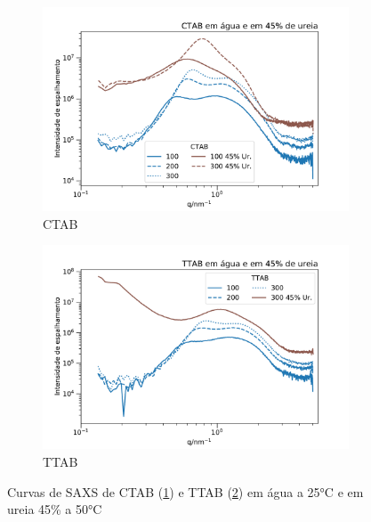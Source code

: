 	\begin{figure}[H]
		\begin{subfigure}[t]{0.45\textwidth}
			\centering
			\includegraphics[width=\textwidth]{./imagens/saxs/micelas_CTAB_agua_ureia}
			\caption{CTAB}
			\label{fig:SAXS_CTAB_com_sem_ureia}
		\end{subfigure} \qquad %
		\begin{subfigure}[t]{0.45\textwidth}
			\centering
			\includegraphics[width=\textwidth]{./imagens/saxs/micelas_TTAB_agua_ureia}
			\caption{TTAB}
			\label{fig:SAXS_TTAB_com_sem_ureia}
		\end{subfigure}
		\caption{Curvas de SAXS de CTAB (\ref{fig:SAXS_CTAB_com_sem_ureia}) e TTAB (\ref{fig:SAXS_TTAB_com_sem_ureia}) em água a 25°C e em ureia 45\% a 50°C}
		\label{fig:SAXS_com_sem_ureia}
	\end{figure}


